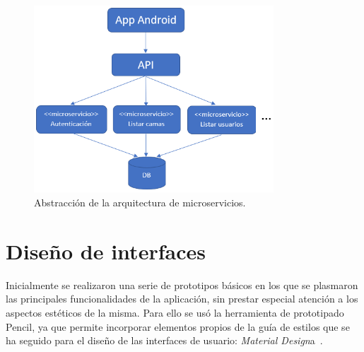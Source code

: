 \begin{figure}[H]
	\centering
	\includegraphics[width=0.8\textwidth]{../img/microservicios.png}
	\caption{Abstracción de la arquitectura de microservicios.}
	\label{fig:microservicios}
\end{figure}

\section{Diseño de interfaces}

Inicialmente se realizaron una serie de prototipos básicos en los que se plasmaron las principales funcionalidades de la aplicación, sin prestar especial atención a los aspectos estéticos de la misma. Para ello se usó la herramienta de prototipado Pencil, ya que permite incorporar elementos propios de la guía de estilos que se ha seguido para el diseño de las interfaces de usuario: \textit{Material Design}a~\cite{materialdesign}. 

